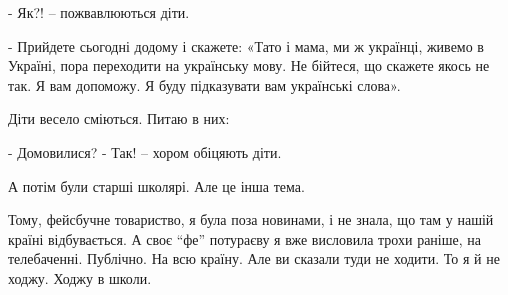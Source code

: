 - Як?! – пожвавлюються діти.

- Прийдете сьогодні додому і скажете: «Тато і мама, ми ж українці, живемо в
Україні, пора переходити на українську мову. Не бійтеся, що скажете якось не
так. Я вам допоможу. Я буду підказувати вам українські слова». 

Діти весело сміються. Питаю в них:

- Домовилися? 
- Так! – хором обіцяють діти. 

А потім були старші школярі. Але це інша тема.  

Тому, фейсбучне товариство, я була поза новинами, і не знала, що там у нашій
країні відбувається. А своє \enquote{фе} потураєву я вже висловила трохи раніше, на
телебаченні. Публічно. На всю країну. Але ви сказали туди не ходити. То я й не
ходжу. Ходжу в школи.
